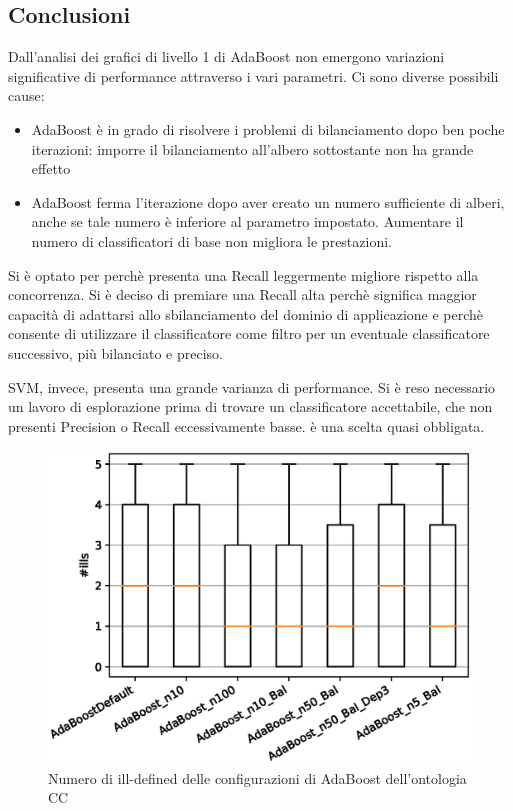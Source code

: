 \documentclass[12pt,a4paper,oneside,hidelinks]{report}
\begin{document}
\subsection{Conclusioni}
Dall'analisi dei grafici di livello 1 di AdaBoost non emergono variazioni significative di performance attraverso i vari parametri. Ci sono diverse possibili cause:
\begin{itemize}
\item AdaBoost è in grado di risolvere i problemi di bilanciamento dopo ben poche iterazioni: imporre il bilanciamento all'albero sottostante non ha grande effetto
\item AdaBoost ferma l'iterazione dopo aver creato un numero sufficiente di alberi, anche se tale numero è inferiore al parametro impostato. Aumentare il numero di classificatori di base non migliora le prestazioni.
\end{itemize}
Si è optato per  perchè presenta una Recall leggermente migliore rispetto alla concorrenza. Si è deciso di premiare una Recall alta perchè significa maggior capacità di adattarsi allo sbilanciamento del dominio di applicazione e perchè consente di utilizzare il classificatore come filtro per un eventuale classificatore successivo, più bilanciato e preciso.

SVM, invece, presenta una grande varianza di performance. Si è reso necessario un lavoro di esplorazione prima di trovare un classificatore accettabile, che non presenti Precision o Recall eccessivamente basse.  è una scelta quasi obbligata.



\vspace*{\fill}

\begin{figure}[ht]%
    \centering
    \includegraphics[scale = 0.80]{CC-AdaBoost-ills.eps}%
    \caption{Numero di ill-defined delle configurazioni di AdaBoost dell'ontologia CC}%
    \label{fig:ill1}%
\end{figure}
\end{document}
